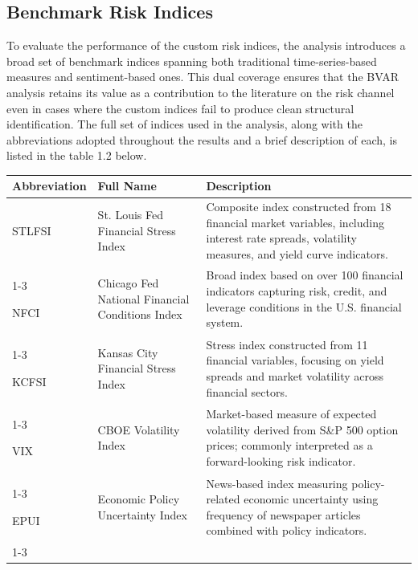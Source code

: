 \documentclass[12pt,a4paper]{report}
\begin{document}
\subsection{Benchmark Risk Indices}

To evaluate the performance of the custom risk indices, the analysis introduces a broad set of benchmark indices spanning both traditional time-series-based measures and sentiment-based ones. This dual coverage ensures that the BVAR analysis retains its value as a contribution to the literature on the risk channel even in cases where the custom indices fail to produce clean structural identification. The full set of indices used in the analysis, along with the abbreviations adopted throughout the results and a brief description of each, is listed in the table 1.2 below.
\begin{table}[H]
\centering
\label{tab:risk_indices}

\vspace{0.3cm}
\renewcommand{\arraystretch}{1.4}

\begin{tabularx}{\textwidth}{p{2.5cm} p{6.5cm} X}
\hline
\textbf{Abbreviation} & \textbf{Full Name} & \textbf{Description} \\
\hline

STLFSI & St. Louis Fed Financial Stress Index 
& Composite index constructed from 18 financial market variables, including interest rate spreads, volatility measures, and yield curve indicators. \\
\cline{1-3}

NFCI & Chicago Fed National Financial Conditions Index 
& Broad index based on over 100 financial indicators capturing risk, credit, and leverage conditions in the U.S. financial system. \\
\cline{1-3}

KCFSI & Kansas City Financial Stress Index 
& Stress index constructed from 11 financial variables, focusing on yield spreads and market volatility across financial sectors. \\
\cline{1-3}

VIX & CBOE Volatility Index 
& Market-based measure of expected volatility derived from S\&P 500 option prices; commonly interpreted as a forward-looking risk indicator. \\
\cline{1-3}

EPUI & Economic Policy Uncertainty Index 
& News-based index measuring policy-related economic uncertainty using frequency of newspaper articles combined with policy indicators. \\
\cline{1-3}


\end{tabularx}
\end{table}
\end{document}
